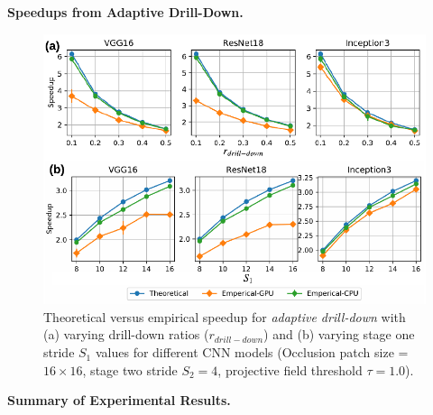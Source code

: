 \vspace{2mm}
\noindent \textbf{Speedups from Adaptive Drill-Down.}

\begin{figure}[t]
\includegraphics[width=\columnwidth]{images/5_2_3_GPU}
\caption{Theoretical versus empirical speedup for \textit{adaptive drill-down} with (a) varying drill-down ratios ($r_{drill-down}$) and (b) varying stage one stride $S_1$ values for different CNN models (Occlusion patch size = $16 \times 16$, stage two stride $S_2=4$, projective field threshold $\tau=1.0$).}
\label{fig:5_2_3_GPU}
\end{figure}

\vspace{2mm}
\noindent \textbf{Summary of Experimental Results.}